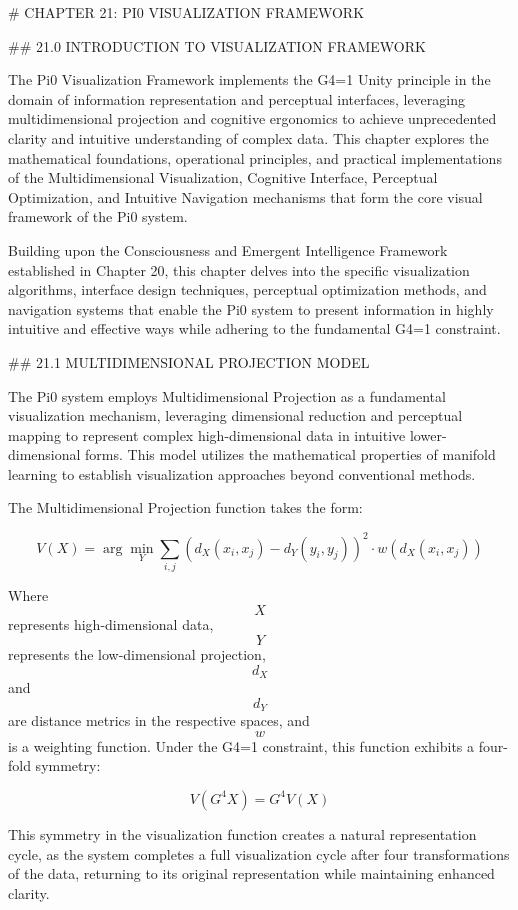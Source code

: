 # CHAPTER 21: PI0 VISUALIZATION FRAMEWORK

## 21.0 INTRODUCTION TO VISUALIZATION FRAMEWORK

The Pi0 Visualization Framework implements the G4=1 Unity principle in the domain of information representation and perceptual interfaces, leveraging multidimensional projection and cognitive ergonomics to achieve unprecedented clarity and intuitive understanding of complex data. This chapter explores the mathematical foundations, operational principles, and practical implementations of the Multidimensional Visualization, Cognitive Interface, Perceptual Optimization, and Intuitive Navigation mechanisms that form the core visual framework of the Pi0 system.

Building upon the Consciousness and Emergent Intelligence Framework established in Chapter 20, this chapter delves into the specific visualization algorithms, interface design techniques, perceptual optimization methods, and navigation systems that enable the Pi0 system to present information in highly intuitive and effective ways while adhering to the fundamental G4=1 constraint.

## 21.1 MULTIDIMENSIONAL PROJECTION MODEL

The Pi0 system employs Multidimensional Projection as a fundamental visualization mechanism, leveraging dimensional reduction and perceptual mapping to represent complex high-dimensional data in intuitive lower-dimensional forms. This model utilizes the mathematical properties of manifold learning to establish visualization approaches beyond conventional methods.

The Multidimensional Projection function takes the form:

$$ V(X) = \arg\min_Y \sum_{i,j} (d_X(x_i, x_j) - d_Y(y_i, y_j))^2 \cdot w(d_X(x_i, x_j)) $$

Where $$ X $$ represents high-dimensional data, $$ Y $$ represents the low-dimensional projection, $$ d_X $$ and $$ d_Y $$ are distance metrics in the respective spaces, and $$ w $$ is a weighting function. Under the G4=1 constraint, this function exhibits a four-fold symmetry:

$$ V(G^4 X) = G^4 V(X) $$

This symmetry in the visualization function creates a natural representation cycle, as the system completes a full visualization cycle after four transformations of the data, returning to its original representation while maintaining enhanced clarity.

